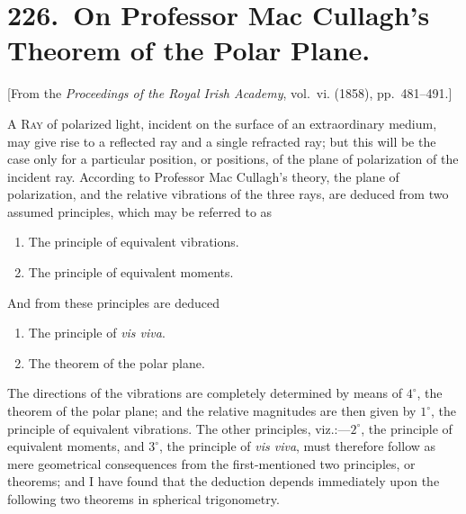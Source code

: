 \documentclass[11pt,a4paper]{book}
\theoremstyle{plain}
\begin{document}
\chapter[On Professor Mac Cullagh's Theorem of the Polar Plane]{226.\ On Professor Mac Cullagh's Theorem of the Polar Plane.}
\label{paper226}

\begin{center}
\small
[From the \textit{Proceedings of the Royal Irish Academy}, vol.~vi. (1858), pp.~481--491.]
\end{center}

\bigskip

\textsc{A Ray} of polarized light, incident on the surface of an extraordinary medium, may give rise to a reflected ray and a single refracted ray; but this will be the case only for a particular position, or positions, of the plane of polarization of the incident ray. According to Professor Mac Cullagh's theory, the plane of polarization, and the relative vibrations of the three rays, are deduced from two assumed principles, which may be referred to as
\begin{enumerate}[label=$\arabic*^{\circ}$.,leftmargin=2em]
\item The principle of equivalent vibrations.
\item The principle of equivalent moments.
\end{enumerate}
And from these principles are deduced
\begin{enumerate}[label=$\arabic*^{\circ}$.,leftmargin=2em,start=3]
\item The principle of \textit{vis viva}.
\item The theorem of the polar plane.
\end{enumerate}

The directions of the vibrations are completely determined by means of $4^{\circ}$, the theorem of the polar plane; and the relative magnitudes are then given by $1^{\circ}$, the principle of equivalent vibrations. The other principles, viz.:---$2^{\circ}$, the principle of equivalent moments, and $3^{\circ}$, the principle of \textit{vis viva}, must therefore follow as mere geometrical consequences from the first-mentioned two principles, or theorems; and I have found that the deduction depends immediately upon the following two theorems in spherical trigonometry.

\bigskip
\end{document}
